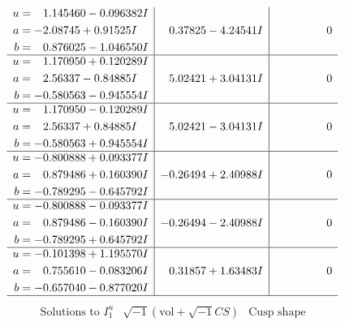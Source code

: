 \documentclass[1p]{elsarticle_modified}
\theoremstyle{definition}
\newcommand{\I}{\sqrt{-1}}
\begin{document}
$$\begin{array}{c|c|c}
\begin{aligned}
u &= \phantom{-}1.145460 - 0.096382 I \\
a &= -2.08745 + 0.91525 I \\
b &= \phantom{-}0.876025 - 1.046550 I\end{aligned}
 & \phantom{-}0.37825 - 4.24541 I & \phantom{-0.000000 } 0 \\ \hline\begin{aligned}
u &= \phantom{-}1.170950 + 0.120289 I \\
a &= \phantom{-}2.56337 - 0.84885 I \\
b &= -0.580563 - 0.945554 I\end{aligned}
 & \phantom{-}5.02421 + 3.04131 I & \phantom{-0.000000 } 0 \\ \hline\begin{aligned}
u &= \phantom{-}1.170950 - 0.120289 I \\
a &= \phantom{-}2.56337 + 0.84885 I \\
b &= -0.580563 + 0.945554 I\end{aligned}
 & \phantom{-}5.02421 - 3.04131 I & \phantom{-0.000000 } 0 \\ \hline\begin{aligned}
u &= -0.800888 + 0.093377 I \\
a &= \phantom{-}0.879486 + 0.160390 I \\
b &= -0.789295 - 0.645792 I\end{aligned}
 & -0.26494 + 2.40988 I & \phantom{-0.000000 } 0 \\ \hline\begin{aligned}
u &= -0.800888 - 0.093377 I \\
a &= \phantom{-}0.879486 - 0.160390 I \\
b &= -0.789295 + 0.645792 I\end{aligned}
 & -0.26494 - 2.40988 I & \phantom{-0.000000 } 0 \\ \hline\begin{aligned}
u &= -0.101398 + 1.195570 I \\
a &= \phantom{-}0.755610 - 0.083206 I \\
b &= -0.657040 - 0.877020 I\end{aligned}
 & \phantom{-}0.31857 + 1.63483 I & \phantom{-0.000000 } 0\\
 \hline 
 \end{array}$$\newpage$$\begin{array}{c|c|c}  
\text{Solutions to }I^u_{1}& \I (\text{vol} + \sqrt{-1}CS) & \text{Cusp shape}\\
 \hline 
\begin{aligned}

\end{aligned}
\end{array}$$
\end{document}
